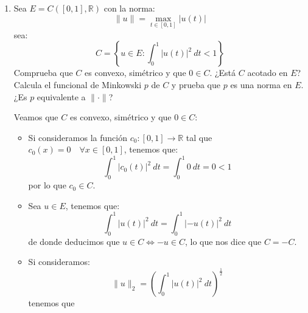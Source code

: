 \begin{ejercicio}
\begin{enumerate}[label=\alph*)]
\begin{itemize}
            \end{itemize}
        \item Sea $E = C([0,1], \mathbb{R})$ con la norma:
            \begin{equation*}
                \|u\| = \max_{t\in [0,1]}|u(t)|
            \end{equation*}
            sea:
            \begin{equation*}
                C = \left\{u\in E: \int_{0}^{1} |u(t)|^2~dt < 1 \right\}
            \end{equation*}
            Comprueba que $C$ es convexo, simétrico y que $0\in C$. ¿Está $C$ acotado en $E$? Calcula el funcional de Minkowski $p$ de $C$ y prueba que $p$ es una norma en $E$. ¿Es $p$ equivalente a $\|\cdot \|$?

            Veamos que $C$ es convexo, simétrico y que $0\in C$:
            \begin{itemize}
                \item Si consideramos la función $c_0:[0,1]\to \mathbb{R}$ tal que $c_0(x) = 0\quad \forall x\in [0,1]$, tenemos que:
                    \begin{equation*}
                        \int_{0}^{1} {|c_0(t)|}^{2}~dt  = \int_{0}^{1} 0~dt  = 0 < 1
                    \end{equation*}
                    por lo que $c_0\in C$.
                \item Sea $u\in E$, tenemos que:
                    \begin{equation*}
                        \int_{0}^{1} {|u(t)|}^{2}~dt  = \int_{0}^{1} {| - u(t)|}^{2}~dt 
                    \end{equation*}
                    de donde deducimos que $u\in C \Longleftrightarrow -u\in C$, lo que nos dice que $C = -C$.
                \item Si consideramos:
                    \begin{equation*}
                        \|u\|_2 = {\left(\int_{0}^{1} {|u(t)|}^{2}~dt \right)}^{\frac{1}{2}}
                    \end{equation*}
                    tenemos que %
            \end{itemize}
    \end{enumerate}
\end{ejercicio}

